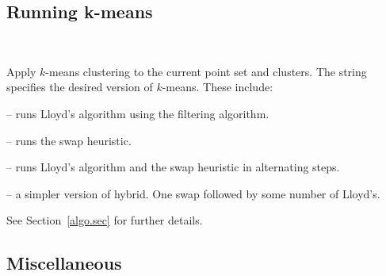 \documentclass[11pt]{article}		%
\newenvironment{description*}%
  {\begin{description}%
    \setlength{\itemsep}{-0.5ex}%
    \setlength{\parsep}{0pt}}%
  {\end{description}}
\begin{document}
% 
% 
%   
% 
% 
% 
% 
  
\subsection{Running k-means}

\begin{description*}
\item[\SF{run\_kmeans \BR{method}}] ~

  	Apply $k$-means clustering to the current point set and clusters.
	The string specifies the desired version of $k$-means.  These
	include:
	\begin{description*}
	\item[\SF{lloyd}] -- runs Lloyd's algorithm using the filtering
		algorithm.
	\item[\SF{swap}] -- runs the swap heuristic.
	\item[\SF{hybrid}] -- runs Lloyd's algorithm and the swap
		heuristic in alternating steps.
	\item[\SF{EZ-hybrid}] -- a simpler version of hybrid. One swap
		followed by some number of Lloyd's.
	\end{description*}
	See Section~\ref{algo.sec} for further details.
\end{description*}

\subsection{Miscellaneous}
\end{document}
